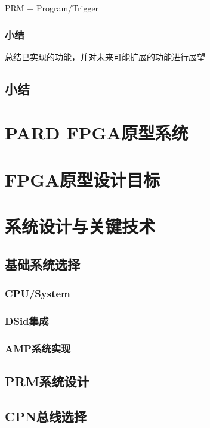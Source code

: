 PRM + Program/Trigger

\subsubsection{小结}

总结已实现的功能，并对未来可能扩展的功能进行展望

\subsection{小结}


\section{PARD FPGA原型系统}

\section{FPGA原型设计目标}


\section{系统设计与关键技术}

\subsection{基础系统选择}

\subsubsection*{CPU/System}
\subsubsection*{DSid集成}
\subsubsection*{AMP系统实现}


\subsection{PRM系统设计}



\subsection{CPN总线选择}

